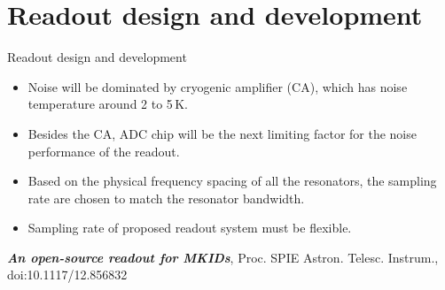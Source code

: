 \documentclass[ignorenonframetext,12pt]{beamer}
\begin{document}
\section{Readout design and development}
\begin{frame}{Readout design and development}


				\begin{itemize}
								\item Noise will be \alert{dominated by cryogenic amplifier (CA)}, which has noise
				temperature around 2 to 5\,K. 
\item Besides the CA, ADC chip will be \alert{the next limiting factor for the
				noise performance of the readout}. 

\item	Based on the physical frequency spacing of all the resonators, \alert{the
				sampling rate are chosen to match the resonator bandwidth}. 
				
\item	Sampling rate of proposed readout system must be
				{\color[rgb]{0.2,0.9,0.3}flexible}.  
				\end{itemize}

				\tiny{\emph{\textbf{An open-source readout for MKIDs}}, Proc. SPIE Astron.
				Telesc.  Instrum., doi:10.1117/12.856832}
\end{frame}
\end{document}
